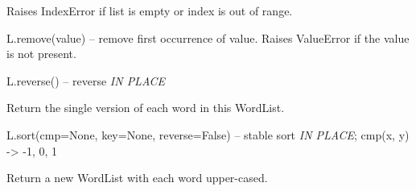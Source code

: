 \documentclass[letterpaper,10pt,english]{sphinxmanual}
\begin{document}
\begin{fulllineitems}
\begin{fulllineitems}
\end{fulllineitems}


\begin{fulllineitems}
\label{api_reference:textblob_de.blob.WordList.pop}
Raises IndexError if list is empty or index is out of range.

\end{fulllineitems}


\begin{fulllineitems}
\label{api_reference:textblob_de.blob.WordList.remove}
L.remove(value) -- remove first occurrence of value.
Raises ValueError if the value is not present.

\end{fulllineitems}


\begin{fulllineitems}
\label{api_reference:textblob_de.blob.WordList.reverse}
L.reverse() -- reverse \emph{IN PLACE}

\end{fulllineitems}


\begin{fulllineitems}
\label{api_reference:textblob_de.blob.WordList.singularize}
Return the single version of each word in this WordList.

\end{fulllineitems}


\begin{fulllineitems}
\label{api_reference:textblob_de.blob.WordList.sort}
L.sort(cmp=None, key=None, reverse=False) -- stable sort \emph{IN PLACE};
cmp(x, y) -\textgreater{} -1, 0, 1

\end{fulllineitems}


\begin{fulllineitems}
\label{api_reference:textblob_de.blob.WordList.upper}
Return a new WordList with each word upper-cased.

\end{fulllineitems}


\end{fulllineitems}
\end{document}
